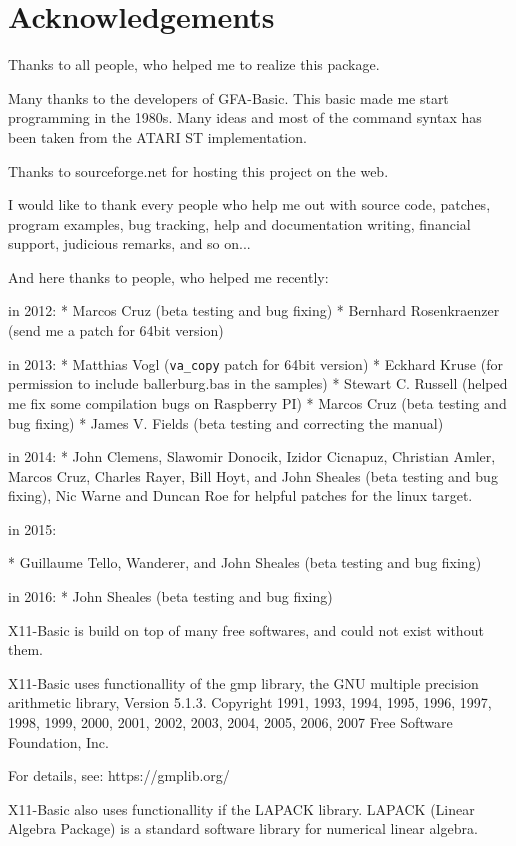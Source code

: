 
\chapter*{Acknowledgements}

Thanks to all people, who helped me to realize this package.

Many  thanks  to  the developers of GFA-Basic. This basic made me
start programming in the 1980s. Many ideas and most of  the  command 
syntax has been taken from the ATARI ST implementation.

Thanks to sourceforge.net for hosting this project on the web.

I would like to thank every people who help me out with source code, 
patches, program examples, bug tracking, help and documentation writing, 
financial support, judicious remarks, and so on...   

And here thanks to people, who helped me recently:

in 2012:
* Marcos Cruz (beta testing and bug fixing)
* Bernhard Rosenkraenzer (send me a patch for 64bit version)

in 2013:
* Matthias Vogl (\verb|va_copy| patch for 64bit version)
* Eckhard Kruse (for permission to include ballerburg.bas in the samples)
* Stewart C. Russell (helped me fix some compilation bugs on Raspberry PI)
* Marcos Cruz (beta testing and bug fixing)
* James V. Fields (beta testing and correcting the manual)

in 2014:
* John Clemens, Slawomir Donocik, Izidor Cicnapuz, Christian Amler,
  Marcos Cruz, Charles Rayer, Bill Hoyt, and John Sheales (beta testing and 
  bug fixing),
  Nic Warne and Duncan Roe for helpful patches for the linux target.

in 2015:

* Guillaume Tello, Wanderer, and John Sheales  (beta testing and bug fixing)

in 2016:
* John Sheales  (beta testing and bug fixing)

X11-Basic is build on top of many free softwares, and could not exist without 
them.

X11-Basic uses functionallity of the gmp library, 
the GNU multiple precision arithmetic library, Version 5.1.3.
   Copyright 1991, 1993, 1994, 1995, 1996, 1997, 1998, 1999, 2000,
2001, 2002, 2003, 2004, 2005, 2006, 2007 Free Software Foundation, Inc.

For details, see: https://gmplib.org/

X11-Basic also uses functionallity if the LAPACK library. 
LAPACK (Linear Algebra Package) is a standard software library for 
numerical linear algebra. 

